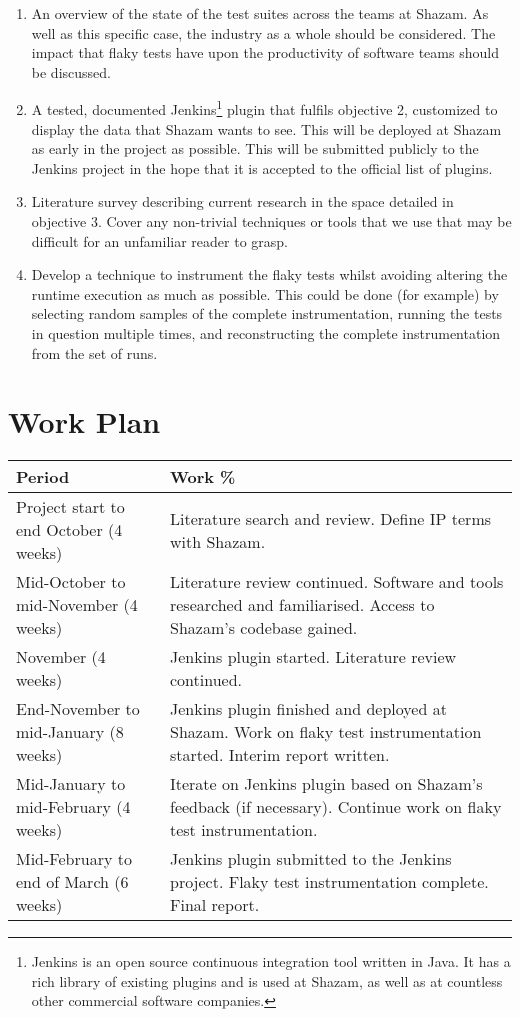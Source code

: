 \begin{enumerate}
	\item{
		An overview of the state of the test suites across the teams at Shazam. As well as this specific case, the industry as a whole should be considered. The impact that flaky tests have upon the productivity of software teams should be discussed.
	}
	\item{
		A tested, documented Jenkins\footnote{Jenkins is an open source continuous integration tool written in Java. It has a rich library of existing plugins and is used at Shazam, as well as at countless other commercial software companies.} plugin that fulfils objective 2, customized to display the data that Shazam wants to see. This will be deployed at Shazam as early in the project as possible. This will be submitted publicly to the Jenkins project in the hope that it is accepted to the official list of plugins.
	}
	\item{
		Literature survey describing current research in the space detailed in objective 3. Cover any non-trivial techniques or tools that we use that may be difficult for an unfamiliar reader to grasp.
	}
	\item{
		Develop a technique to instrument the flaky tests whilst avoiding altering the runtime execution as much as possible. This could be done (for example) by selecting random samples of the complete instrumentation, running the tests in question multiple times, and reconstructing the complete instrumentation from the set of runs.
	}
\end{enumerate}

\section{Work Plan}

\begin{center}
    \begin{tabular}{ | l | p{6cm} |}
    \hline
    Period & Work \% \\ \hline
    Project start to end October (4 weeks) & Literature search and review. Define IP terms with Shazam. \\ \hline
    Mid-October to mid-November (4 weeks) & Literature review continued. Software and tools researched and familiarised. Access to Shazam's codebase gained. \\ \hline
    November (4 weeks) & Jenkins plugin started. Literature review continued. \\ \hline
    End-November to mid-January (8 weeks) & Jenkins plugin finished and deployed at Shazam. Work on flaky test instrumentation started. Interim report written. \\ \hline
    Mid-January to mid-February (4 weeks) & Iterate on Jenkins plugin based on Shazam's feedback (if necessary). Continue work on flaky test instrumentation. \\ \hline
    Mid-February to end of March (6 weeks) & Jenkins plugin submitted to the Jenkins project. Flaky test instrumentation complete. Final report. \\ \hline
    \end{tabular}
\end{center}

\newpage

\setcounter{section}{\value{oldSectionCounter2}}
\setcounter{page}{\value{oldPageCounter2}}